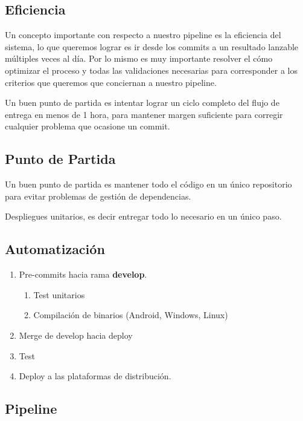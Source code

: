 \subsection{Eficiencia}\label{pipeline:eficiencia}

Un concepto importante con respecto a nuestro pipeline es la eficiencia del
sistema, lo que queremos lograr es ir desde los commits a un resultado lanzable
múltiples veces al día. Por lo mismo es muy importante resolver el cómo
optimizar el proceso y todas las validaciones necesarias para corresponder a
los criterios que queremos que conciernan a nuestro pipeline.

Un buen punto de partida es intentar lograr un ciclo completo del flujo de entrega en menos de 1 hora, para mantener margen suficiente para corregir cualquier problema que ocasione un commit.

\subsection{Punto de Partida}\label{pipeline:punto-de-partida}

Un buen punto de partida es mantener todo el código en un único repositorio para evitar problemas de gestión de dependencias.

Despliegues unitarios, es decir entregar todo lo necesario en un único paso.


\subsection{Automatización}\label{pipeline:automatizacion}

\begin{enumerate}
  \item Pre-commits hacia rama \textbf{develop}.
  \begin{enumerate}
    \item Test unitarios
    \item Compilación de binarios (Android, Windows, Linux)
  \end{enumerate}
  \item Merge de develop hacia deploy
  \item Test
  \item Deploy a las plataformas de distribución.
\end{enumerate}

\subsection{Pipeline}

